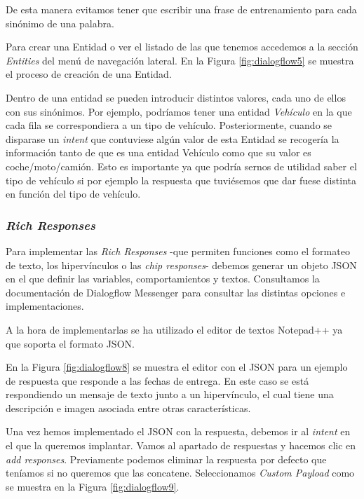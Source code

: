 De esta manera evitamos tener que escribir una frase de entrenamiento para cada sinónimo de una palabra.

\newpage

Para crear una Entidad o ver el listado de las que tenemos accedemos a la sección \textit{Entities} del menú de navegación lateral. En la Figura \ref{fig:dialogflow5} se muestra el proceso de creación de una Entidad.


Dentro de una entidad se pueden introducir distintos valores, cada uno de ellos con sus sinónimos. Por ejemplo, podríamos tener una entidad \textit{Vehículo} en la que cada fila se correspondiera a un tipo de vehículo. Posteriormente, cuando se disparase un \textit{intent} que contuviese algún valor de esta Entidad se recogería la información tanto de que es una entidad Vehículo como que su valor es coche/moto/camión. Esto es importante ya que podría sernos de utilidad saber el tipo de vehículo si por ejemplo la respuesta que tuviésemos que dar fuese distinta en función del tipo de vehículo.

\subsubsection{\textit{Rich Responses}}\label{Notepad}

Para implementar las \textit{Rich Responses} -que permiten funciones como el formateo de texto, los hipervínculos o las \textit{chip responses}- debemos generar un objeto JSON en el que definir las variables, comportamientos y textos. Consultamos la documentación de Dialogflow Messenger \cite{richResponses} para consultar las distintas opciones e implementaciones.

A la hora de implementarlas se ha utilizado el editor de textos Notepad++ ya que soporta el formato JSON.


En la Figura \ref{fig:dialogflow8} se muestra el editor con el JSON para un ejemplo de respuesta que responde a las fechas de entrega. En este caso se está respondiendo un mensaje de texto junto a un hipervínculo, el cual tiene una descripción e imagen asociada entre otras características.

Una vez hemos implementado el JSON con la respuesta, debemos ir al \textit{intent} en el que la queremos implantar. Vamos al apartado de respuestas y hacemos clic en \textit{add responses}. Previamente podemos eliminar la respuesta por defecto que teníamos si no queremos que las concatene. Seleccionamos \textit{Custom Payload} como se muestra en la Figura \ref{fig:dialogflow9}.


